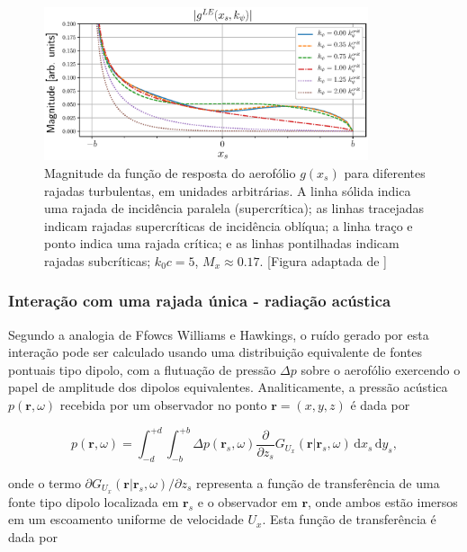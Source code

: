 \documentclass[a4paper, 11pt, twoside]{article}
\newcommand{\ud}{\,\mathrm{d}}
\begin{document}
\begin{figure}
	\centering
	\includegraphics[width=0.85\textwidth]{../figures/Abs_gLE_ky_kc50.eps}
	\caption{Magnitude da função de resposta do aerofólio $g(x_s)$ para diferentes rajadas turbulentas, em unidades arbitrárias. A linha sólida indica uma rajada de incidência paralela (supercrítica); as linhas tracejadas indicam rajadas supercríticas de incidência oblíqua; a linha traço e ponto indica uma rajada crítica; e as linhas pontilhadas indicam rajadas subcríticas; $k_0 c = 5$, $M_x \approx 0.17$. [Figura adaptada de \citet{Roger13}]}
	\label{fig:Abs_gLE_kc50}
\end{figure}

\subsubsection{Interação com uma rajada única - radiação acústica}

Segundo a analogia de Ffowcs Williams e Hawkings, o ruído gerado por esta interação pode ser calculado usando uma distribuição equivalente de fontes pontuais tipo dipolo, com a flutuação de pressão $\Delta p$ sobre o aerofólio exercendo o papel de amplitude dos dipolos equivalentes. Analiticamente, a pressão acústica $p(\mathbf{r}, \omega)$ recebida por um observador no ponto $\mathbf{r} = (x, y, z)$ é dada por

\begin{equation}
	p(\mathbf{r}, \omega) = \int_{-d}^{+d} \int_{-b}^{+b} \Delta p(\mathbf{r}_s, \omega) \frac{\partial }{\partial z_s} G_{U_x}(\mathbf{r} | \mathbf{r}_s, \omega) \ud x_s \ud y_s,
	\label{eq:ac_radiation_single_gust}
\end{equation}

\noindent onde o termo $\partial G_{U_x}(\mathbf{r} | \mathbf{r}_s, \omega) / \partial z_s$ representa a função de transferência de uma fonte tipo dipolo localizada em $\mathbf{r}_s$ e o observador em $\mathbf{r}$, onde ambos estão imersos em um escoamento uniforme de velocidade $U_x$. Esta função de transferência é dada por
\end{document}
